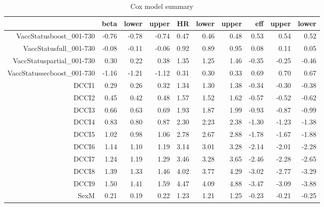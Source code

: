 \begin{table}[ht]
\centering
\begin{tabular}{rrrrrrrrrr}
  \hline
 & beta & lower & upper & HR & lower & upper & eff & upper & lower \\ 
  \hline
VaccStatusboost\_001-730 & -0.76 & -0.78 & -0.74 & 0.47 & 0.46 & 0.48 & 0.53 & 0.54 & 0.52 \\ 
  VaccStatusfull\_001-730 & -0.08 & -0.11 & -0.06 & 0.92 & 0.89 & 0.95 & 0.08 & 0.11 & 0.05 \\ 
  VaccStatuspartial\_001-730 & 0.30 & 0.22 & 0.38 & 1.35 & 1.25 & 1.46 & -0.35 & -0.25 & -0.46 \\ 
  VaccStatussecboost\_001-730 & -1.16 & -1.21 & -1.12 & 0.31 & 0.30 & 0.33 & 0.69 & 0.70 & 0.67 \\ 
  DCCI1 & 0.29 & 0.26 & 0.32 & 1.34 & 1.30 & 1.38 & -0.34 & -0.30 & -0.38 \\ 
  DCCI2 & 0.45 & 0.42 & 0.48 & 1.57 & 1.52 & 1.62 & -0.57 & -0.52 & -0.62 \\ 
  DCCI3 & 0.66 & 0.63 & 0.69 & 1.93 & 1.87 & 1.99 & -0.93 & -0.87 & -0.99 \\ 
  DCCI4 & 0.83 & 0.80 & 0.87 & 2.30 & 2.23 & 2.38 & -1.30 & -1.23 & -1.38 \\ 
  DCCI5 & 1.02 & 0.98 & 1.06 & 2.78 & 2.67 & 2.88 & -1.78 & -1.67 & -1.88 \\ 
  DCCI6 & 1.14 & 1.10 & 1.19 & 3.14 & 3.01 & 3.28 & -2.14 & -2.01 & -2.28 \\ 
  DCCI7 & 1.24 & 1.19 & 1.29 & 3.46 & 3.28 & 3.65 & -2.46 & -2.28 & -2.65 \\ 
  DCCI8 & 1.39 & 1.33 & 1.46 & 4.02 & 3.77 & 4.29 & -3.02 & -2.77 & -3.29 \\ 
  DCCI9 & 1.50 & 1.41 & 1.59 & 4.47 & 4.09 & 4.88 & -3.47 & -3.09 & -3.88 \\ 
  SexM & 0.21 & 0.19 & 0.22 & 1.23 & 1.21 & 1.25 & -0.23 & -0.21 & -0.25 \\ 
   \hline
\end{tabular}
\caption{Cox model summary} 
\end{table}
